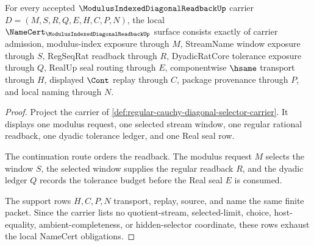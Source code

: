 \begin{theorem}
\label{thm:regular-cauchy-diagonal-selector-namecert-obligations}
For every accepted $\ModulusIndexedDiagonalReadbackUp$ carrier $D=(M,S,R,Q,E,H,C,P,N)$, the local $\NameCert_{\ModulusIndexedDiagonalReadbackUp}$ surface consists exactly of carrier admission, modulus-index exposure through $M$, StreamName window exposure through $S$, RegSeqRat readback through $R$, DyadicRatCore tolerance exposure through $Q$, RealUp seal routing through $E$, componentwise $\hsame$ transport through $H$, displayed $\Cont$ replay through $C$, package provenance through $P$, and local naming through $N$.
\end{theorem}
\begin{proof}
Project the carrier of \autoref{def:regular-cauchy-diagonal-selector-carrier}. It displays one modulus request, one selected stream window, one regular rational readback, one dyadic tolerance ledger, and one Real seal row.

The continuation route orders the readback. The modulus request $M$ selects the window $S$, the selected window supplies the regular readback $R$, and the dyadic ledger $Q$ records the tolerance budget before the Real seal $E$ is consumed.

The support rows $H,C,P,N$ transport, replay, source, and name the same finite packet. Since the carrier lists no quotient-stream, selected-limit, choice, host-equality, ambient-completeness, or hidden-selector coordinate, these rows exhaust the local NameCert obligations.
\end{proof}

